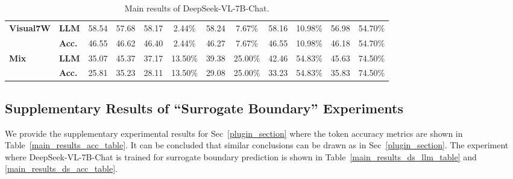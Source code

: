 \begin{table*}
{\begin{tabular}{llcccccccc|cc}
    \midrule
    \multirow{2}{*}{\textbf{Visual7W}} & \textbf{LLM} & 58.54 & 57.68 & 58.17 & 2.44\% & 58.24 & 7.67\% & 58.16 & 10.98\% & 56.98 & 54.70\% \\
     & \textbf{Acc.} & 46.55 & 46.62 & 46.40 & 2.44\% & 46.27 & 7.67\% & 46.55 & 10.98\% & 46.18 & 54.70\% \\ 
    \midrule
    \midrule
    \multirow{2}{*}{\textbf{Mix}} & \textbf{LLM} & 35.07 & 45.37 & 37.17 & 13.50\% & 39.38 & 25.00\% & 42.46 & 54.83\% & 45.63 & 74.50\% \\
     & \textbf{Acc.} & 25.81 & 35.23 & 28.11 & 13.50\% & 29.08 & 25.00\% & 33.23 & 54.83\% & 35.83 & 74.50\% \\
    \bottomrule
    \end{tabular}
    }
    \caption{Main results of DeepSeek-VL-7B-Chat.}
    \label{main_results_ds_7b_table}
\end{table*}



\subsection{Supplementary Results of ``Surrogate Boundary'' Experiments}
\label{supplementary_results_of_surrogate}

We provide the supplementary experimental results for Sec~\ref{plugin_section} where the token accuracy metrics are shown in Table~\ref{main_results_acc_table}. It can be concluded that similar conclusions can be drawn as in Sec~\ref{plugin_section}. The experiment where DeepSeek-VL-7B-Chat is trained for surrogate boundary prediction is shown in Table~\ref{main_results_ds_llm_table} and \ref{main_results_ds_acc_table}.


